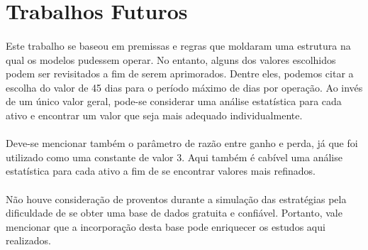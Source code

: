 \FloatBarrier
\section{Trabalhos Futuros}



\paragraph{} Este trabalho se baseou em premissas e regras que moldaram uma estrutura na qual os modelos pudessem operar. No entanto, alguns dos valores escolhidos podem ser revisitados a fim de serem aprimorados. Dentre eles, podemos citar a escolha do valor de 45 dias para o período máximo de dias por operação. Ao invés de um único valor geral, pode-se considerar uma análise estatística para cada ativo e encontrar um valor que seja mais adequado individualmente.

\paragraph{} Deve-se mencionar também o parâmetro de razão entre ganho e perda, já que foi utilizado como uma constante de valor 3. Aqui também é cabível uma análise estatística para cada ativo a fim de se encontrar valores mais refinados.

\paragraph{} Não houve consideração de proventos durante a simulação das estratégias pela dificuldade de se obter uma base de dados gratuita e confiável. Portanto, vale mencionar que a incorporação desta base pode enriquecer os estudos aqui realizados.
